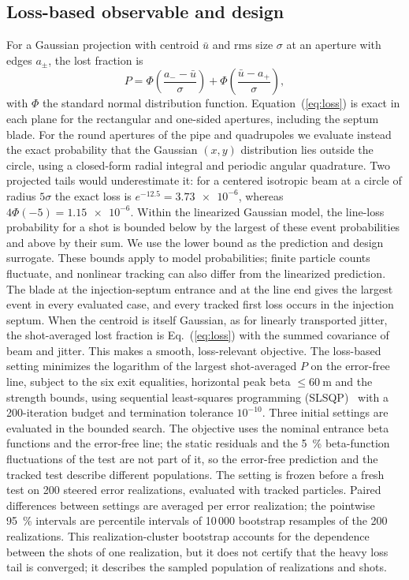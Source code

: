 \documentclass[final,5p,twocolumn]{elsarticle}
\begin{document}
\subsection{Loss-based observable and design}\label{sec:loss}
For a Gaussian projection with centroid $\bar u$ and rms size $\sigma$ at an
aperture with edges $a_\pm$, the lost fraction is
\begin{equation}
 P=\Phi\!\left(\frac{a_--\bar u}{\sigma}\right)+\Phi\!\left(\frac{\bar u-a_+}{\sigma}\right),
 \label{eq:loss}
\end{equation}
with $\Phi$ the standard normal distribution function. Equation~(\ref{eq:loss}) is
exact in each plane for the rectangular and one-sided apertures, including the
septum blade. For the round apertures of the pipe and quadrupoles we evaluate
instead the exact probability that the Gaussian $(x,y)$ distribution lies outside
the circle, using a closed-form radial integral and periodic angular quadrature.
Two projected tails would underestimate it: for a centered isotropic beam at a
circle of radius $5\sigma$ the exact loss is $e^{-12.5}=\num{3.73e-6}$, whereas
$4\Phi(-5)=\num{1.15e-6}$. Within the linearized Gaussian model, the line-loss probability for a shot is
bounded below by the largest of these event probabilities and above by their sum.
We use the lower bound as the prediction and design surrogate. These bounds apply
to model probabilities; finite particle counts fluctuate, and nonlinear tracking
can also differ from the linearized prediction. The blade at the
injection-septum entrance and at the line end gives the largest event in every
evaluated case, and every tracked first loss occurs in the injection septum.
When the centroid is itself Gaussian, as for linearly
transported jitter, the shot-averaged lost fraction is Eq.~(\ref{eq:loss}) with the
summed covariance of beam and jitter. This makes a smooth, loss-relevant objective.
The loss-based setting minimizes the logarithm of the largest shot-averaged $P$ on
the error-free line, subject to the six exit equalities, horizontal peak beta
$\le\SI{60}{\metre}$ and the strength bounds, using sequential least-squares programming
(SLSQP)~\cite{Kraft1988} with a 200-iteration budget and termination tolerance
$10^{-10}$. Three initial settings are evaluated in the bounded search. The objective
uses the nominal entrance beta functions and the error-free line; the static
residuals and the \SI{5}{\percent} beta-function fluctuations of the test are not part of it, so
the error-free prediction and the tracked test describe different populations. The setting is frozen
before a fresh test on 200 steered error realizations, evaluated with
tracked particles. Paired differences between settings are averaged per error
realization; the pointwise \SI{95}{\percent} intervals are percentile intervals of
10\,000 bootstrap resamples of the 200 realizations. This realization-cluster
bootstrap accounts for the dependence between the shots of one realization, but it
does not certify that the heavy loss tail is converged; it describes the sampled
population of realizations and shots.
\end{document}
